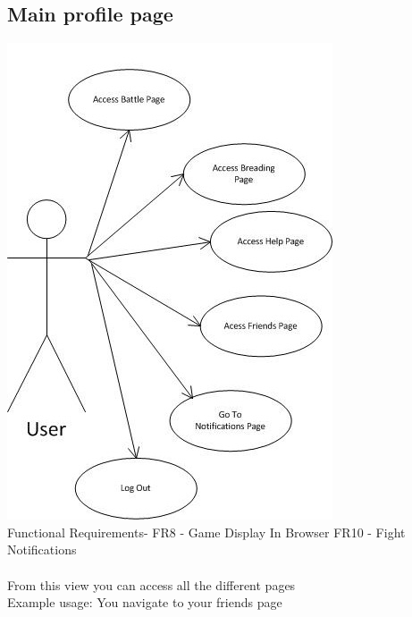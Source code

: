 \documentclass{project}
\begin{document}
\newpage
\subsection{Main profile page}
\includegraphics[scale=0.6]{MainProfilePageUseCase.jpg}
\\
Functional Requirements-
FR8 - Game Display In Browser
FR10 - Fight Notifications
\\
\\
From this view you can access all the different pages
\\
Example usage: You navigate to your friends page

\newpage
\end{document}
